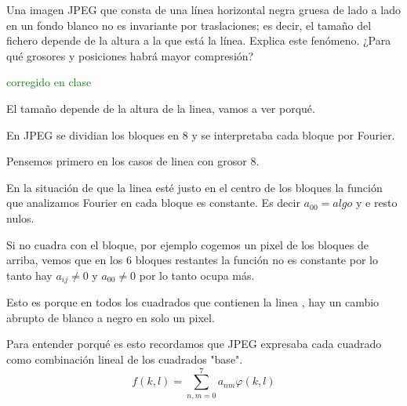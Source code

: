 \begin{problem}[8]
Una imagen JPEG que consta de una línea horizontal negra gruesa de lado a lado
en un fondo blanco no es invariante por traslaciones; es decir, el tamaño del fichero depende de la altura a la que está la línea. Explica este fenómeno. ¿Para qué grosores y posiciones habrá mayor compresión?

\solution

\yoP

\textcolor{green}{corregido en clase}


El tamaño depende de la altura de la linea, vamos a ver porqué.

En JPEG se dividian los bloques en 8 y se interpretaba cada bloque por Fourier.

Pensemos primero en los casos de linea con grosor 8.

En la situación de que la linea esté justo en el centro de los bloques la función que analizamos Fourier en cada bloque es constante. Es decir $a_{00} = algo$ y e resto nulos.

Si no cuadra con el bloque, por ejemplo cogemos un pixel de los bloques de arriba, vemos que en los 6 bloques restantes la función no es constante por lo tanto hay $a_{ij} \neq 0$ y $a_{00}\neq 0$ por lo tanto ocupa más.

Esto es porque en todos los cuadrados que contienen la linea , hay un cambio abrupto de blanco a negro en solo un pixel.

Para entender porqué es esto recordamos que JPEG expresaba cada cuadrado como combinación lineal de los cuadrados "base".
$$f(k,l) = \sum_{n,m = 0}^{7} a_{nm} \varphi(k,l)$$






\end{problem}

